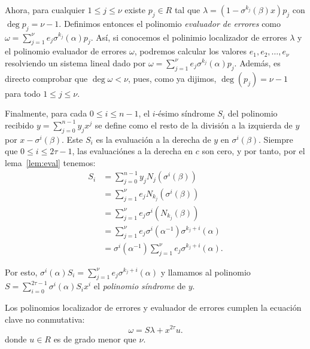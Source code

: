 Ahora, para cualquier \(1 \leq j \leq \nu\) existe \(p_j \in R\) tal que \(\lambda = (1 - \sigma^{k_j}(\beta)x)p_j\) con \(\deg p_j = \nu - 1\). Definimos entonces el polinomio \textit{evaluador de errores} como \(\omega = \sum_{j=1}^\nu e_j \sigma^{k_j}(\alpha)p_j\). Así, si conocemos el polinimio localizador de errores \(\lambda\) y el polinomio evaluador de errores \(\omega\), podremos calcular los valores \(e_1, e_2, \ldots, e_{\nu}\) resolviendo un sistema lineal dado por \(\omega = \sum_{j=1}^{\nu} e_j \sigma^{k_j}(\alpha)p_j\). Además, es directo comprobar que \(\deg \omega < \nu\), pues, como ya dijimos, \(\deg(p_j) = \nu -1\) para todo \(1 \le j \le \nu\).

Finalmente, para cada \(0 \leq i \leq n-1\), el \(i\)-ésimo síndrome \(S_i\) del polinomio recibido  \(y = \sum_{j=0}^{n-1} y_j x^j\) se define como el resto de la división a la izquierda de \(y\) por  \(x - \sigma^i(\beta)\). Este \(S_i\) es la evaluación a la derecha de \(y\) en  \(\sigma^i(\beta)\). Siempre que \(0 \leq i \leq 2\tau -1\), las evaluaciónes a la derecha en \(c\) son cero, y por tanto, por el lema~\ref{lem:eval} tenemos:
 \[
\begin{aligned}
    S_i &= \sum_{j=0}^{n-1} y_j N_j(\sigma^i(\beta)) \\
    &= \sum_{j=1}^\nu e_j N_{k_j}(\sigma^i(\beta))\\
    &= \sum_{j=1}^\nu e_j \sigma^i(N_{k_j}(\beta))\\
    &= \sum_{j=1}^\nu e_j \sigma^i(\alpha^{-1})\sigma^{k_j + i}(\alpha)\\
    &= \sigma^i(\alpha^{-1})\sum_{j=1}^\nu e_j \sigma^{k_j + i}(\alpha).
\end{aligned}
\]

Por esto, \(\sigma^i(\alpha)S_i = \sum_{j=1}^\nu e_j \sigma^{k_j + i}(\alpha)\) y llamamos al polinomio \(S = \sum_{i=0}^{2\tau -1} \sigma^i(\alpha) S_i x^i\) el \textit{polinomio síndrome} de \(y\).

\begin{theorem}
    Los polinomios localizador de errores y evaluador de errores cumplen la ecuación clave no conmutativa:
    \[
    \omega = S\lambda + x^{2\tau}u.
    \]
    donde \(u \in R\) es de grado menor que \(\nu\).
\end{theorem}


